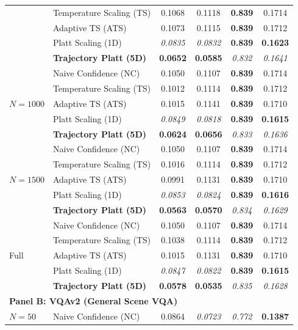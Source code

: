 \begin{table}[t]
\begin{tabular}{llcccc}
 & Temperature Scaling (TS) & 0.1068 & 0.1118 & \textbf{0.839} & 0.1714 \\
 & Adaptive TS (ATS) & 0.1073 & 0.1115 & \textbf{0.839} & 0.1712 \\
 & Platt Scaling (1D) & \textit{0.0835} & \textit{0.0832} & \textbf{0.839} & \textbf{0.1623} \\
 & \textbf{Trajectory Platt (5D)} & \textbf{0.0652} & \textbf{0.0585} & \textit{0.832} & \textit{0.1641} \\
\midrule
\multirow{5}{*}{$N = 1000$} & Naive Confidence (NC) & 0.1050 & 0.1107 & \textbf{0.839} & 0.1714 \\
 & Temperature Scaling (TS) & 0.1012 & 0.1114 & \textbf{0.839} & 0.1712 \\
 & Adaptive TS (ATS) & 0.1015 & 0.1141 & \textbf{0.839} & 0.1710 \\
 & Platt Scaling (1D) & \textit{0.0849} & \textit{0.0818} & \textbf{0.839} & \textbf{0.1615} \\
 & \textbf{Trajectory Platt (5D)} & \textbf{0.0624} & \textbf{0.0656} & \textit{0.833} & \textit{0.1636} \\
\midrule
\multirow{5}{*}{$N = 1500$} & Naive Confidence (NC) & 0.1050 & 0.1107 & \textbf{0.839} & 0.1714 \\
 & Temperature Scaling (TS) & 0.1016 & 0.1114 & \textbf{0.839} & 0.1712 \\
 & Adaptive TS (ATS) & 0.0991 & 0.1131 & \textbf{0.839} & 0.1710 \\
 & Platt Scaling (1D) & \textit{0.0853} & \textit{0.0824} & \textbf{0.839} & \textbf{0.1616} \\
 & \textbf{Trajectory Platt (5D)} & \textbf{0.0563} & \textbf{0.0570} & \textit{0.834} & \textit{0.1629} \\
\midrule
\multirow{5}{*}{Full} & Naive Confidence (NC) & 0.1050 & 0.1107 & \textbf{0.839} & 0.1714 \\
 & Temperature Scaling (TS) & 0.1038 & 0.1114 & \textbf{0.839} & 0.1712 \\
 & Adaptive TS (ATS) & 0.1015 & 0.1131 & \textbf{0.839} & 0.1710 \\
 & Platt Scaling (1D) & \textit{0.0847} & \textit{0.0822} & \textbf{0.839} & \textbf{0.1615} \\
 & \textbf{Trajectory Platt (5D)} & \textbf{0.0578} & \textbf{0.0535} & \textit{0.835} & \textit{0.1628} \\
\midrule
\multicolumn{6}{l}{\textbf{Panel B: VQAv2 (General Scene VQA)}} \\
\midrule
\multirow{5}{*}{$N = 50$} & Naive Confidence (NC) & 0.0864 & \textit{0.0723} & \textit{0.772} & \textbf{0.1387} \\

\end{tabular}
\end{table}
